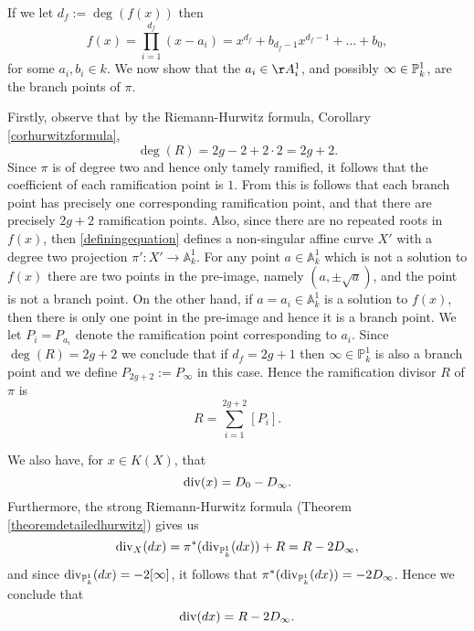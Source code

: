 If we let $d_f:=\deg(f(x))$ then 
    \begin{equation}\label{equationexpansionoff(x)}
    f(x) = \prod_{i=1}^{d_f} (x-a_i) = x^{d_f} + b_{d_f - 1}x^{d_f-1} + \ldots + b_0,
    \end{equation}
for some $a_i, b_i \in k$.
We now show that the $a_i \in \AA_i^1$, and possibly $\infty \in {\mathbb P}_k^1$, are the branch points of $\pi$.

Firstly, observe that by the Riemann-Hurwitz formula, Corollary \ref{corhurwitzformula},
    \[ 
    \deg(R) = 2g -2 +2\cdot 2 = 2g + 2.
    \]
Since $\pi$ is of degree two and hence only tamely ramified, it follows that the coefficient of each ramification point is $1$.
From this is follows that each branch point has precisely one corresponding ramification point, and that there are precisely $2g+2$ ramification points.
Also, since there are no repeated roots in $f(x)$, then \eqref{definingequation} defines a non-singular affine curve $X'$ with a degree two projection $\pi'\colon X'\rightarrow \mathbb A_k^1$.
For any point $a\in \mathbb A_k^1$ which is not a solution to $f(x)$ there are two points in the pre-image, namely $(a,\pm \sqrt{a})$, and the point is not a branch point.
On the other hand, if $a = a_i \in \mathbb A_k^1$ is a solution to $f(x)$, then there is only one point in the pre-image and hence it is a branch point.
We let $P_i = P_{a_i}$ denote the ramification point corresponding to $a_i$.
Since $\deg(R) = 2g+2$ we conclude that if $d_f = 2g+1$ then $\infty \in \mathbb P_k^1$ is also a branch point and we define $P_{2g+2} := P_\infty$ in this case.
Hence the ramification divisor $R$ of $\pi$ is
    \[
    R = \sum_{i=1}^{2g+2} [P_i] .
    \]

We also have, for $x \in K(X)$, that
    \begin{equation}\label{equationdivxpis2}
    \operatorname{div} (x)  = D_0 - D_\infty.
    \end{equation}
Furthermore, the strong Riemann-Hurwitz formula (Theorem \ref{theoremdetailedhurwitz}) gives us
    \[
    \operatorname{div}_X (dx) = \pi^*( \operatorname{div}_{\mathbb P^1_k}(dx)) + R = R - 2D_{\infty},
    \]
and since $\operatorname{div}_{{\mathbb P}_k^1}(dx) = -2[\infty]$, it follows that $\pi^*(\operatorname{div}_{{\mathbb P}_k^1}(dx)) = -2D_\infty$.
Hence we conclude that
    \begin{equation}\label{equationdifferentialdivisor}
    \operatorname{div}(dx) = R - 2D_\infty.
    \end{equation}

